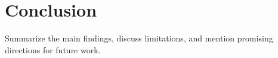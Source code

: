 \section{Conclusion}

Summarize the main findings, discuss limitations, and mention promising directions for future work.
